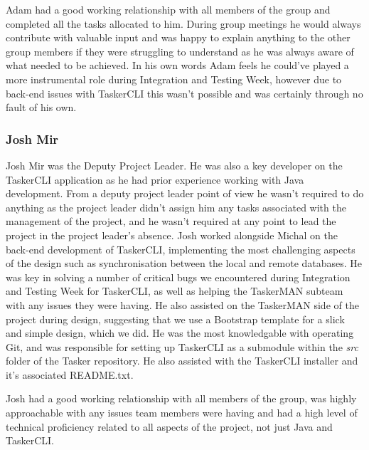\documentclass{project}
\begin{document}
Adam had a good working relationship with all members of the group and completed all the tasks allocated to him. During group meetings he would always contribute with valuable input and was happy to explain anything to the other group members if they were struggling to understand as he was always aware of what needed to be achieved. In his own words Adam feels he could've played a more instrumental role during Integration and Testing Week, however due to back-end issues with TaskerCLI this wasn't possible and was certainly through no fault of his own.
\subsubsection{Josh Mir}
Josh Mir was the Deputy Project Leader. He was also a key developer on the TaskerCLI application as he had prior experience working with Java development. From a deputy project leader point of view he wasn't required to do anything as the project leader didn't assign him any tasks associated with the management of the project, and he wasn't required at any point to lead the project in the project leader's absence. Josh worked alongside Michal on the back-end development of TaskerCLI, implementing the most challenging aspects of the design\cite{se.qa.ds} such as synchronisation between the local and remote databases. He was key in solving a number of critical bugs we encountered during Integration and Testing Week for TaskerCLI, as well as helping the TaskerMAN subteam with any issues they were having. He also assisted on the TaskerMAN side of the project during design, suggesting that we use a Bootstrap template for a slick and simple design, which we did. He was the most knowledgable with operating Git, and was responsible for setting up TaskerCLI as a submodule within the \textit{src} folder of the Tasker repository. He also assisted with the TaskerCLI installer and it's associated README.txt.

Josh had a good working relationship with all members of the group, was highly approachable with any issues team members were having and had a high level of technical proficiency related to all aspects of the project, not just Java and TaskerCLI.
\end{document}
